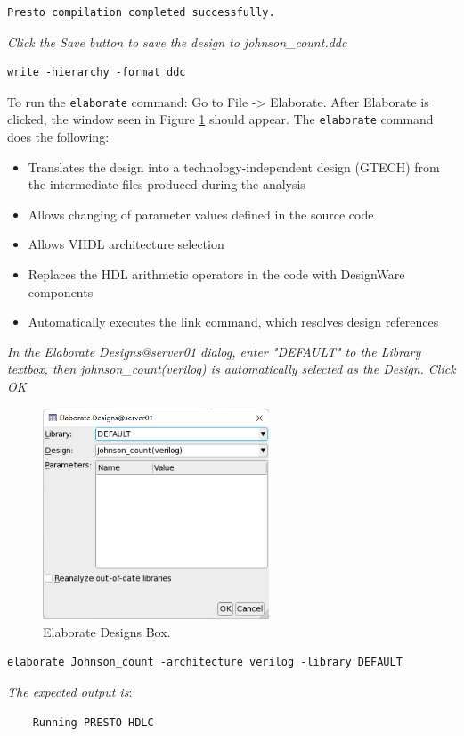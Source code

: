 \documentclass[a4paper,12pt,twoside]{article}
\begin{document}
\begin{enumerate}
\begin{verbatim}
Presto compilation completed successfully.
    \end{verbatim}
    \textit{Click the Save button to save the design to johnson\_count.ddc}
    \begin{verbatim}
write -hierarchy -format ddc
    \end{verbatim}
    To run the \texttt{elaborate} command: Go to File -> Elaborate. After Elaborate is clicked, the window seen in Figure \ref{f21} should appear. The \texttt{elaborate} command does the following:
    \begin{itemize}
        \item Translates the design into a technology-independent design (GTECH) from the intermediate files produced during the analysis
        \item Allows changing of parameter values defined in the source code
        \item Allows VHDL architecture selection
        \item Replaces the HDL arithmetic operators in the code with DesignWare components
        \item Automatically executes the link command, which resolves design references
    \end{itemize}
    \textit{In the Elaborate Designs@server01 dialog, enter "DEFAULT" to the Library textbox, then johnson\_count(verilog) is automatically selected as the Design. Click OK}
    \begin{figure}[H]
        \centering
        \includegraphics[width=0.6\textwidth]{images/21.png}
        \caption{Elaborate Designs Box.}
        \label{f21}
    \end{figure}
    \begin{verbatim}
elaborate Johnson_count -architecture verilog -library DEFAULT
    \end{verbatim}
    \textit{The expected output is}:
    \begin{verbatim}
    Running PRESTO HDLC


\end{verbatim}
\end{enumerate}
\end{document}

